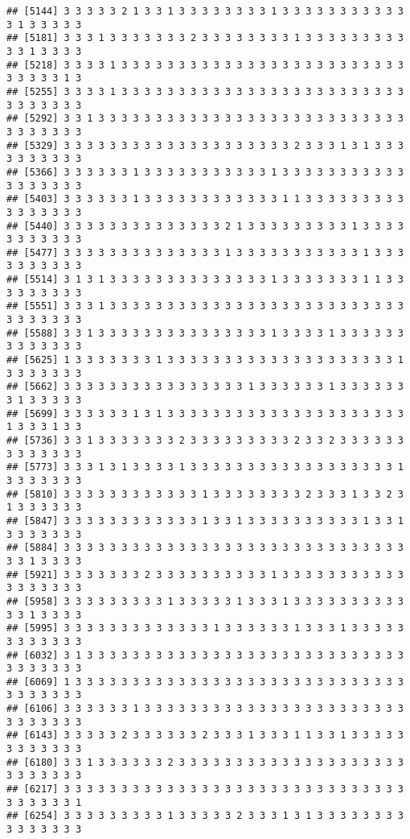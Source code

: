 \documentclass[
]{article}
\begin{document}
\begin{verbatim}
## [5144] 3 3 3 3 3 2 1 3 3 1 3 3 3 3 3 3 3 3 1 3 3 3 3 3 3 3 3 3 3 3 3 1 3 3 3 3 3
## [5181] 3 3 3 1 3 3 3 3 3 3 3 2 3 3 3 3 3 3 3 3 1 3 3 3 3 3 3 3 3 3 3 3 1 3 3 3 3
## [5218] 3 3 3 3 1 3 3 3 3 3 3 3 3 3 3 3 3 3 3 3 3 3 3 3 3 3 3 3 3 3 3 3 3 3 3 1 3
## [5255] 3 3 3 3 1 3 3 3 3 3 3 3 3 3 3 3 3 3 3 3 3 3 3 3 3 3 3 3 3 3 3 3 3 3 3 3 3
## [5292] 3 3 1 3 3 3 3 3 3 3 3 3 3 3 3 3 3 3 3 3 3 3 3 3 3 3 3 3 3 3 3 3 3 3 3 3 3
## [5329] 3 3 3 3 3 3 3 3 3 3 3 3 3 3 3 3 3 3 3 3 2 3 3 3 1 3 1 3 3 3 3 3 3 3 3 3 3
## [5366] 3 3 3 3 3 3 1 3 3 3 3 3 3 3 3 3 3 3 1 3 3 3 3 3 3 3 3 3 3 3 3 3 3 3 3 3 3
## [5403] 3 3 3 3 3 3 1 3 3 3 3 3 3 3 3 3 3 3 3 1 1 3 3 3 3 3 3 3 3 3 3 3 3 3 3 3 3
## [5440] 3 3 3 3 3 3 3 3 3 3 3 3 3 3 2 1 3 3 3 3 3 3 3 3 3 1 3 3 3 3 3 3 3 3 3 3 3
## [5477] 3 3 3 3 3 3 3 3 3 3 3 3 3 3 1 3 3 3 3 3 3 3 3 3 3 3 1 3 3 3 3 3 3 3 3 3 3
## [5514] 3 1 3 1 3 3 3 3 3 3 3 3 3 3 3 3 3 3 1 3 3 3 3 3 3 3 1 1 3 3 3 3 3 3 3 3 3
## [5551] 3 3 3 1 3 3 3 3 3 3 3 3 3 3 3 3 3 3 3 3 3 3 3 3 3 3 3 3 3 3 3 3 3 3 3 3 3
## [5588] 3 3 1 3 3 3 3 3 3 3 3 3 3 3 3 3 3 3 1 3 3 3 3 1 3 3 3 3 3 3 3 3 3 3 3 3 3
## [5625] 1 3 3 3 3 3 3 3 1 3 3 3 3 3 3 3 3 3 3 3 3 3 3 3 3 3 3 3 3 1 3 3 3 3 3 3 3
## [5662] 3 3 3 3 3 3 3 3 3 3 3 3 3 3 3 3 1 3 3 3 3 3 3 1 3 3 3 3 3 3 3 1 3 3 3 3 3
## [5699] 3 3 3 3 3 3 1 3 1 3 3 3 3 3 3 3 3 3 3 3 3 3 3 3 3 3 3 3 3 3 1 3 3 3 1 3 3
## [5736] 3 3 1 3 3 3 3 3 3 3 2 3 3 3 3 3 3 3 3 3 2 3 3 2 3 3 3 3 3 3 3 3 3 3 3 3 3
## [5773] 3 3 3 1 3 1 3 3 3 3 1 3 3 3 3 3 3 3 3 3 3 3 3 3 3 3 3 3 3 1 3 3 3 3 3 3 3
## [5810] 3 3 3 3 3 3 3 3 3 3 3 3 1 3 3 3 3 3 3 3 3 2 3 3 3 1 3 3 2 3 1 3 3 3 3 3 3
## [5847] 3 3 3 3 3 3 3 3 3 3 3 3 1 3 3 1 3 3 3 3 3 3 3 3 3 3 1 3 3 1 3 3 3 3 3 3 3
## [5884] 3 3 3 3 3 3 3 3 3 3 3 3 3 3 3 3 3 3 3 3 3 3 3 3 3 3 3 3 3 3 3 3 1 3 3 3 3
## [5921] 3 3 3 3 3 3 3 2 3 3 3 3 3 3 3 3 3 3 1 3 3 3 3 3 3 3 3 3 3 3 3 3 3 3 3 3 3
## [5958] 3 3 3 3 3 3 3 3 3 1 3 3 3 3 3 1 3 3 3 1 3 3 3 3 3 3 3 3 3 3 3 3 1 3 3 3 3
## [5995] 3 3 3 3 3 3 3 3 3 3 3 3 3 1 3 3 3 3 3 3 1 3 3 3 1 3 3 3 3 3 3 3 3 3 3 3 3
## [6032] 3 1 3 3 3 3 3 3 3 3 3 3 3 3 3 3 3 3 3 3 3 3 3 3 3 3 3 3 3 3 3 3 3 3 3 3 3
## [6069] 1 3 3 3 3 3 3 3 3 3 3 3 3 3 3 3 3 3 3 3 3 3 3 3 3 3 3 3 3 3 3 3 3 3 3 3 3
## [6106] 3 3 3 3 3 3 1 3 3 3 3 3 3 3 3 3 3 3 3 3 3 3 3 3 3 3 3 3 3 3 3 3 3 3 3 3 3
## [6143] 3 3 3 3 3 2 3 3 3 3 3 3 2 3 3 3 1 3 3 3 1 1 3 3 1 3 3 3 3 3 3 3 3 3 3 3 3
## [6180] 3 3 1 3 3 3 3 3 3 2 3 3 3 3 3 3 3 3 3 3 3 3 3 3 3 3 3 3 3 3 3 3 3 3 3 3 3
## [6217] 3 3 3 3 3 3 3 3 3 3 3 3 3 3 3 3 3 3 3 3 3 3 3 3 3 3 3 3 3 3 3 3 3 3 3 3 1
## [6254] 3 3 3 3 3 3 3 3 3 1 3 3 3 3 3 2 3 3 3 1 3 1 3 3 3 3 3 3 3 3 3 3 3 3 3 3 3

\end{verbatim}
\end{document}
